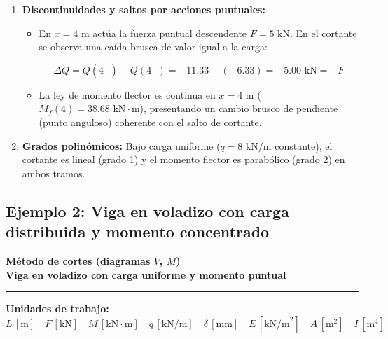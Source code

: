 {\begin{enumerate}
        \item \textbf{Discontinuidades y saltos por acciones puntuales:}

              \begin{itemize}

                  \item En $x = 4\text{ m}$ actúa la fuerza puntual descendente $F = 5\text{ kN}$. En el cortante se observa una caída brusca de valor igual a la carga:

                        \[

                            \Delta Q = Q(4^+) - Q(4^-) = -11.33 - (-6.33) = -5.00\text{ kN} = -F

                        \]

                  \item La ley de momento flector es continua en $x = 4\text{ m}$ ($M_f(4) = 38.68\text{ kN}\cdot\text{m}$), presentando un cambio brusco de pendiente (punto anguloso) coherente con el salto de cortante.

              \end{itemize}

        \item \textbf{Grados polinómicos:} Bajo carga uniforme ($q = 8\text{ kN/m}$ constante), el cortante es lineal (grado 1) y el momento flector es parabólico (grado 2) en ambos tramos.

    \end{enumerate}

}





\subsection{Ejemplo 2: Viga en voladizo con carga distribuida y momento concentrado}



\begin{tcolorbox}[colback=blue!3!white, colframe=blue!40!black, arc=3pt, boxrule=0.8pt, left=8pt, right=8pt, top=6pt, bottom=6pt]

    \centering

    {\Large\bfseries\color{blue!60!black} Método de cortes (diagramas $V$, $M$)}\\[2pt]

    {\normalsize\bfseries Viga en voladizo con carga uniforme y momento puntual}



    \vspace{4pt}\hrule\vspace{4pt}

    {\small\textbf{Unidades de trabajo:} $L\,[\text{m}] \quad F\,[\text{kN}] \quad M\,[\text{kN}\cdot\text{m}] \quad q\,[\text{kN/m}] \quad \delta\,[\text{mm}] \quad E\,[\text{kN/m}^2] \quad A\,[\text{m}^2] \quad I\,[\text{m}^4]$}

\end{tcolorbox}



